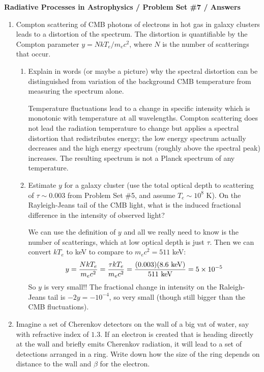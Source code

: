 \documentclass[11pt, preprint]{article}
\begin{document}
\begin{center}
  {\bf Radiative Processes in Astrophysics / Problem Set \#7 /
    Answers}
\end{center}

\begin{enumerate}
\item Compton scattering of CMB photons of electrons in hot gas in
  galaxy clusters leads to a distortion of the spectrum. The
  distortion is quantifiable by the Compton parameter $y=N kT_e /
  m_ec^2$, where $N$ is the number of scatterings that occur.
  \begin{enumerate}
    \item Explain in words (or maybe a picture) why the spectral
      distortion can be distinguished from variation of the background
      CMB temperature from measuring the spectrum alone.

      \begin{answer}
        Temperature fluctuations lead to a change in specific
        intensity which is monotonic with temperature at all
        wavelengths. Compton scattering does not lead the radiation
        temperature to change but applies a spectral distortion that
        redistributes energy; the low energy spectrum actually
        decreases and the high energy spectrum (roughly above the
        spectral peak) increases. The resulting spectrum is not 
        a Planck spectrum of any temperature.
      \end{answer}
    \item Estimate $y$ for a galaxy cluster (use the total optical
      depth to scattering of $\tau\sim 0.003$ from Problem Set \#5,
      and assume $T_e\sim 10^8$ K). On the Rayleigh-Jeans tail of the
      CMB light, what is the induced fractional difference in the
      intensity of observed light? 

      \begin{answer}
        We can use the definition of $y$ and all we really need to
        know is the number of scatterings, which at low optical depth
        is just $\tau$. Then we can convert $kT_e$ to keV to compare
        to $m_ec^2 = 511$ keV:
        \begin{equation}
          y  = \frac{N kT_e}{m_e c^2} = \frac{\tau kT_e}{m_e c^2} =
          \frac{(0.003) (8.6 {\rm ~keV})}{511 {\rm ~keV}} = 5 \times
          10^{-5}
        \end{equation}
        So $y$ is very small!! The fractional change in intensity on
        the Raleigh-Jeans tail is $-2y = -10^{-4}$, so very small
        (though still bigger than the CMB fluctuations).
      \end{answer}
  \end{enumerate}
\item Imagine a set of Cherenkov detectors on the wall of a big vat of
  water, say with refractive index of $1.3$. If an electron is created
  that is heading directly at the wall and briefly emits Cherenkov
  radiation, it will lead to a set of detections arranged in a
  ring. Write down how the size of the ring depends on distance to the
  wall and $\beta$ for the electron. 


\end{enumerate}
\end{document}
